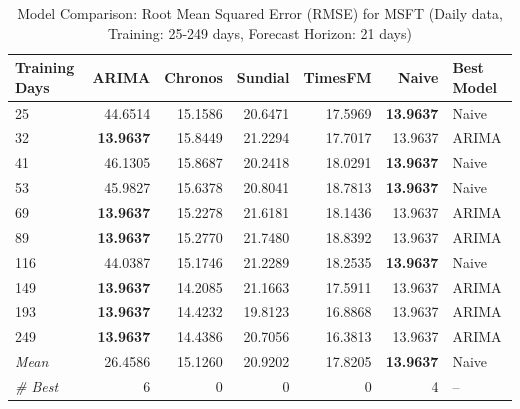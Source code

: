 \begin{table}[htbp]
\centering
\caption{Model Comparison: Root Mean Squared Error (RMSE) for MSFT (Daily data, Training: 25-249 days, Forecast Horizon: 21 days)}
\label{tab:comparison_MSFT_1d_train-less-year-log_h21_RMSE}
\small
\begin{tabular}{lrrrrrl}
\toprule
Training Days & ARIMA & Chronos & Sundial & TimesFM & Naive & Best Model \\
\midrule
25 & 44.6514 & 15.1586 & 20.6471 & 17.5969 & \textbf{13.9637} & Naive \\
32 & \textbf{13.9637} & 15.8449 & 21.2294 & 17.7017 & 13.9637 & ARIMA \\
41 & 46.1305 & 15.8687 & 20.2418 & 18.0291 & \textbf{13.9637} & Naive \\
53 & 45.9827 & 15.6378 & 20.8041 & 18.7813 & \textbf{13.9637} & Naive \\
69 & \textbf{13.9637} & 15.2278 & 21.6181 & 18.1436 & 13.9637 & ARIMA \\
89 & \textbf{13.9637} & 15.2770 & 21.7480 & 18.8392 & 13.9637 & ARIMA \\
116 & 44.0387 & 15.1746 & 21.2289 & 18.2535 & \textbf{13.9637} & Naive \\
149 & \textbf{13.9637} & 14.2085 & 21.1663 & 17.5911 & 13.9637 & ARIMA \\
193 & \textbf{13.9637} & 14.4232 & 19.8123 & 16.8868 & 13.9637 & ARIMA \\
249 & \textbf{13.9637} & 14.4386 & 20.7056 & 16.3813 & 13.9637 & ARIMA \\
\midrule
\textit{Mean} & 26.4586 & 15.1260 & 20.9202 & 17.8205 & \textbf{13.9637} & Naive \\
\textit{\# Best} & 6 & 0 & 0 & 0 & 4 & -- \\
\bottomrule
\end{tabular}
\end{table}